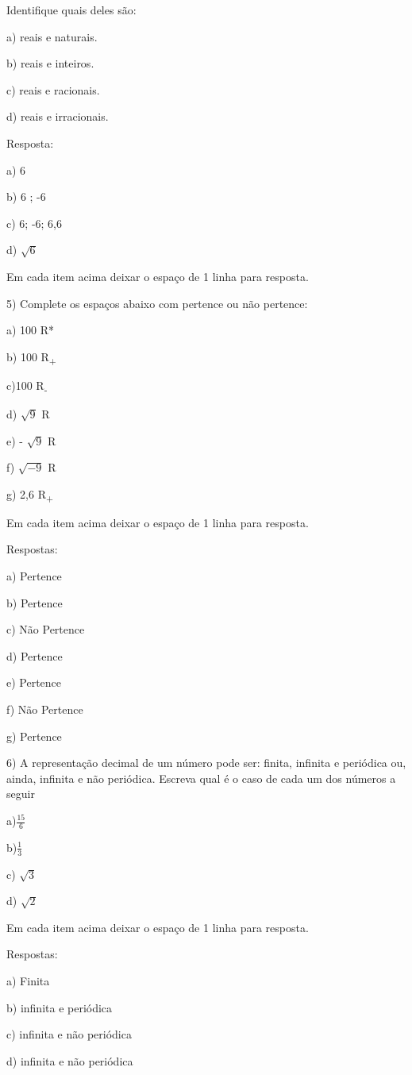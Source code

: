 Identifique quais deles são:

a) reais e naturais.

b) reais e inteiros.

c) reais e racionais.

d) reais e irracionais.

Resposta:

a) 6

b) 6 ; -6

c) 6; -6; 6,6

d) \(\sqrt{6}\)

Em cada item acima deixar o espaço de 1 linha para resposta.

5) Complete os espaços abaixo com pertence ou não pertence:

a) 100 R*

b) 100 R\textsubscript{+}

c)100 R\textsubscript{-}

d) \(\sqrt{9}\) R

e) - \(\sqrt{9}\) R

f) \(\sqrt{- 9}\) R

g) 2,6 R\textsubscript{+}

Em cada item acima deixar o espaço de 1 linha para resposta.

Respostas:

a) Pertence

b) Pertence

c) Não Pertence

d) Pertence

e) Pertence

f) Não Pertence

g) Pertence

6) A representação decimal de um número pode ser: finita, infinita e
periódica ou, ainda, infinita e não periódica. Escreva qual é o caso de
cada um dos números a seguir

a)\(\frac{15}{6}\)

b)\(\frac{1}{3}\)

c) \(\sqrt{3}\)

d) \(\sqrt{2}\)

Em cada item acima deixar o espaço de 1 linha para resposta.

Respostas:

a) Finita

b) infinita e periódica

c) infinita e não periódica

d) infinita e não periódica

